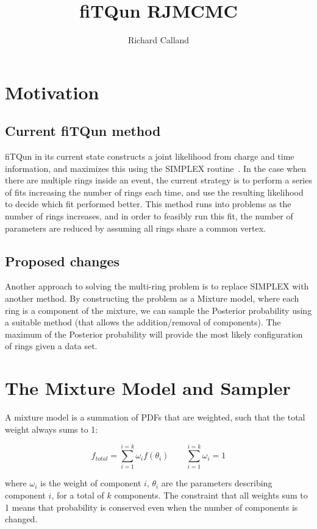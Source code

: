 \documentclass[11pt]{article} %
\title{fiTQun RJMCMC}
\author{Richard Calland}
\begin{document}
\maketitle

\section{Motivation}
\subsection{Current fiTQun method}
fiTQun in its current state constructs a joint likelihood from charge and time information, and maximizes this using the SIMPLEX routine~\cite{SIMPLEX}. In the case when there are multiple rings inside an event, the current strategy is to perform a series of fits increasing the number of rings each time, and use the resulting likelihood to decide which fit performed better. This method runs into problems as the number of rings increases, and in order to feasibly run this fit, the number of parameters are reduced by assuming all rings share a common vertex.

\subsection{Proposed changes}
Another approach to solving the multi-ring problem is to replace SIMPLEX with another method. By constructing the problem as a Mixture model, where each ring is a component of the mixture, we can sample the Posterior probability using a suitable method (that allows the addition/removal of components). The maximum of the Posterior probability will provide the most likely configuration of rings given a data set.

\section{The Mixture Model and Sampler}
A mixture model is a summation of PDFs that are weighted, such that the total weight always sums to 1: 

\begin{equation}
f_{total} = \sum_{i=1}^{i=k}\omega_{i}f(\theta_{i}) \qquad \sum_{i=1}^{i=k}\omega_{i} = 1
\end{equation}

where $\omega_{i}$ is the weight of component $i$, $\theta_{i}$ are the parameters describing component $i$, for a total of $k$ components. The constraint that all weights sum to 1 means that probability is conserved even when the number of components is changed.
\end{document}
